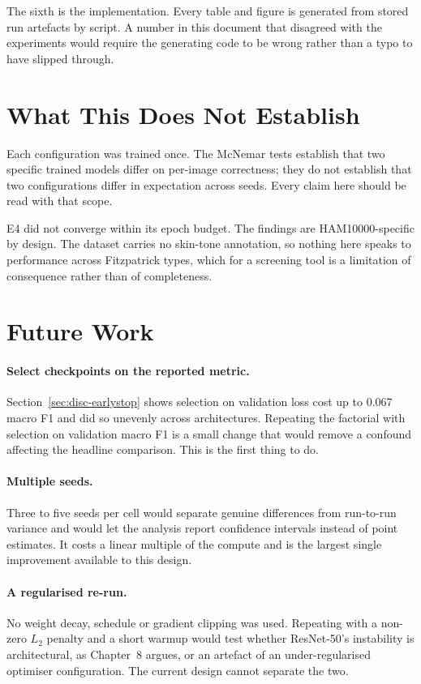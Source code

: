 The sixth is the implementation. Every table and figure is generated from stored run
artefacts by script. A number in this document that disagreed with the experiments would
require the generating code to be wrong rather than a typo to have slipped through.

\section{What This Does Not Establish}
\label{sec:conc-limits}

Each configuration was trained once. The McNemar tests establish that two specific
trained models differ on per-image correctness; they do not establish that two
configurations differ in expectation across seeds. Every claim here should be read with
that scope.

E4 did not converge within its epoch budget. The findings are HAM10000-specific by
design. The dataset carries no skin-tone annotation, so nothing here speaks to
performance across Fitzpatrick types, which for a screening tool is a limitation of
consequence rather than of completeness.

\section{Future Work}
\label{sec:future}

\paragraph{Select checkpoints on the reported metric.} Section~\ref{sec:disc-earlystop}
shows selection on validation loss cost up to 0.067 macro F1 and did so unevenly across
architectures. Repeating the factorial with selection on validation macro F1 is a small
change that would remove a confound affecting the headline comparison. This is the first
thing to do.

\paragraph{Multiple seeds.} Three to five seeds per cell would separate genuine
differences from run-to-run variance and would let the analysis report confidence
intervals instead of point estimates. It costs a linear multiple of the compute and is
the largest single improvement available to this design.

\paragraph{A regularised re-run.} No weight decay, schedule or gradient clipping was
used. Repeating with a non-zero $L_2$ penalty and a short warmup would test whether
ResNet-50's instability is architectural, as Chapter~8 argues, or an artefact of an
under-regularised optimiser configuration. The current design cannot separate the two.

